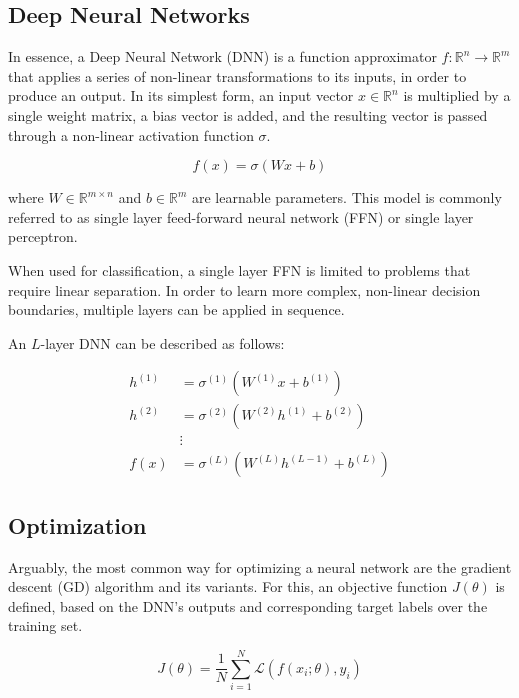 \subsection{Deep Neural Networks}
In essence, a Deep Neural Network (DNN) is a function approximator $f: \mathbb{R}^n \rightarrow \mathbb{R}^m$ that applies a series of non-linear transformations to its inputs, in order to produce an output. In its simplest form, an input vector $x \in \mathbb{R}^n$ is multiplied by a single weight matrix, a bias vector is added, and the resulting vector is passed through a non-linear activation function $\sigma$.

\begin{equation}
    f(x) = \sigma(W x + b)
\end{equation}

where $W \in \mathbb{R}^{m \times n}$ and $b \in \mathbb{R}^{m}$ are learnable parameters.
This model is commonly referred to as single layer feed-forward neural network (FFN) or single layer perceptron.

When used for classification, a single layer FFN is limited to problems that require linear separation. In order to learn more complex, non-linear decision boundaries, multiple layers can be applied in sequence.

An $L$-layer DNN can be described as follows:

\begin{equation}
    \label{eq:DNN}
    \begin{split}
        h^{(1)} &= \sigma^{(1)}(W^{(1)} x + b^{(1)}) \\
        h^{(2)} &= \sigma^{(2)}(W^{(2)} h^{(1)} + b^{(2)}) \\
        & \vdots \\
        f(x) &= \sigma^{(L)}(W^{(L)} h^{(L-1)} + b^{(L)})
    \end{split}
\end{equation}



\subsection{Optimization}
Arguably, the most common way for optimizing a neural network are the gradient descent (GD) algorithm and its variants. For this, an objective function $J(\theta)$ is defined, based on the DNN's outputs and corresponding target labels over the training set.

\begin{equation}
    J(\theta) = \frac{1}{N} \sum_{i=1}^{N} \mathcal{L}(f(x_i; \theta), y_i)
\end{equation}


